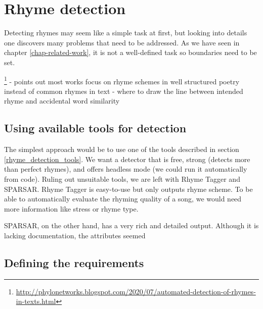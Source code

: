 
\chapter{Rhyme detection}
Detecting rhymes may seem like a simple task at first, but looking into details one discovers many problems that need to be addressed. As we have seen in chapter \ref{chap-related-work}, it is not a well-defined task so boundaries need to be set.


\footnote{\url{http://phylonetworks.blogspot.com/2020/07/automated-detection-of-rhymes-in-texts.html}}
- points out most works focus on rhyme schemes in well structured poetry instead of common rhymes in text
- where to draw the line between intended rhyme and accidental word similarity

\section{Using available tools for detection}
The simplest approach would be to use one of the tools described in section \ref{rhyme_detection_tools}. We want a detector that is free, strong (detects more than perfect rhymes), and offers headless mode (we could run it automatically from code). Ruling out unsuitable tools, we are left with Rhyme Tagger and SPARSAR. Rhyme Tagger is easy-to-use but only outputs rhyme scheme. To be able to automatically evaluate the rhyming quality of a song, we would need more information like stress or rhyme type.

SPARSAR, on the other hand, has a very rich and detailed output. Although it is lacking documentation, the attributes seemed


\section{Defining the requirements}\label{defining_the_requirements}

